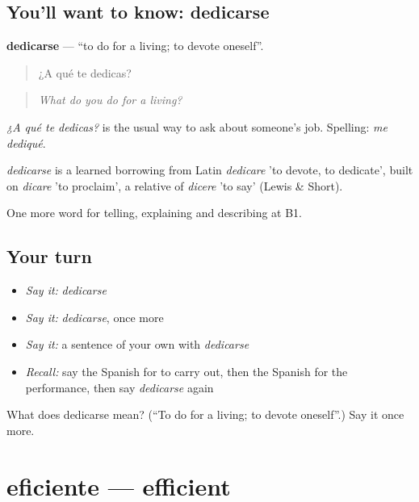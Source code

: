 \subsection*{You'll want to know: dedicarse}
\textbf{dedicarse} — \textquotedblleft{}to do for a living; to devote oneself\textquotedblright{}.

\begin{quote}
¿A qué te dedicas?
\end{quote}

\begin{quote}
\emph{What do you do for a living?}
\end{quote}

\emph{¿A qué te dedicas?} is the usual way to ask about someone's job. Spelling: \emph{me dediqué}.

\begin{cousinweb}
\emph{dedicarse} is a learned borrowing from Latin \emph{dedicare} 'to devote, to dedicate', built on \emph{dicare} 'to proclaim', a relative of \emph{dicere} 'to say' (Lewis \& Short).
\end{cousinweb}

\begin{grammarlens}[title={What you've built}]
One more word for telling, explaining and describing at B1.
\end{grammarlens}

\subsection*{Your turn}
\begin{itemize}
\raggedright
  \item \emph{Say it:} \emph{dedicarse}
  \item \emph{Say it:} \emph{dedicarse}, once more
  \item \emph{Say it:} a sentence of your own with \emph{dedicarse}
  \item \emph{Recall:} say the Spanish for to carry out, then the Spanish for the performance, then say \emph{dedicarse} again
\end{itemize}

\begin{tcolorbox}[breakable,colback=teal!4,colframe=teal!35!black,title={Before you move on}]
What does dedicarse mean? (\textquotedblleft{}To do for a living; to devote oneself\textquotedblright{}.) Say it once more.
\end{tcolorbox}
\section[eficiente]{eficiente — efficient}

